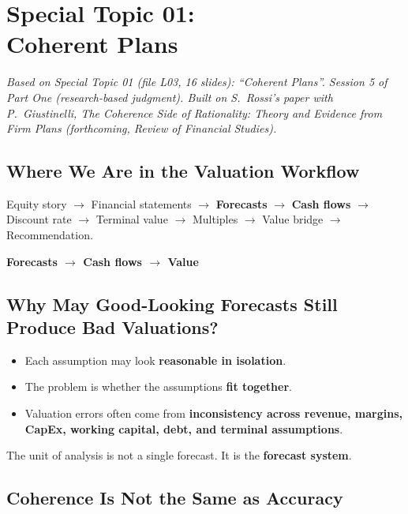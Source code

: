 \chapter[Special Topic 01: Coherent Plans]{Special Topic 01:\\Coherent Plans}\label{ch:coherent}

\emph{Based on Special Topic 01 (file L03, 16 slides): ``Coherent Plans''. Session 5 of Part One (research-based judgment). Built on S.\ Rossi's paper with P.\ Giustinelli, \emph{The Coherence Side of Rationality: Theory and Evidence from Firm Plans} (forthcoming, \emph{Review of Financial Studies}).}

\section{Where We Are in the Valuation Workflow}

Equity story $\to$ Financial statements $\to$ \textbf{Forecasts} $\to$ \textbf{Cash flows} $\to$ Discount rate $\to$ Terminal value $\to$ Multiples $\to$ Value bridge $\to$ Recommendation.
\begin{keybox}[Today]
\textbf{Forecasts $\longrightarrow$ Cash flows $\longrightarrow$ Value}
\end{keybox}

\section{Why May Good-Looking Forecasts Still Produce Bad Valuations?}

\begin{itemize}
  \item Each assumption may look \textbf{reasonable in isolation}.
  \item The problem is whether the assumptions \textbf{fit together}.
  \item Valuation errors often come from \textbf{inconsistency across revenue, margins, CapEx, working capital, debt, and terminal assumptions}.
\end{itemize}
\begin{keybox}
The unit of analysis is not a single forecast. It is the \textbf{forecast system}.
\end{keybox}

\section{Coherence Is Not the Same as Accuracy}

